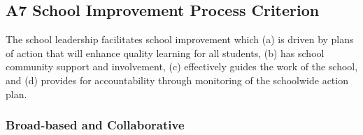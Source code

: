 \subsection{A7 School Improvement Process Criterion}

The school leadership facilitates school improvement which (a) is driven by plans of action that will enhance quality learning for all students, (b) has school community support and involvement, (c) effectively guides the work of the school, and (d) provides for accountability through monitoring of the schoolwide action plan.

\subsubsection{Broad-based and Collaborative}



